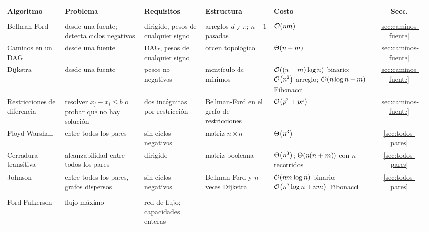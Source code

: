 \documentclass[11pt,letterpaper]{article}
\begin{document}
\begin{center}
\begin{tabular}{@{}>{\raggedright\arraybackslash}p{2.5cm}%
                >{\raggedright\arraybackslash}p{3.3cm}%
                >{\raggedright\arraybackslash}p{3.1cm}%
                >{\raggedright\arraybackslash}p{2.7cm}%
                >{\raggedright\arraybackslash}p{2.9cm}c@{}}
  \toprule
  \textbf{Algoritmo} & \textbf{Problema} & \textbf{Requisitos}
    & \textbf{Estructura} & \textbf{Costo} & \textbf{Secc.} \\
  \midrule
  \multicolumn{6}{@{}l}{\textit{Caminos más cortos}} \\
  \addlinespace[2pt]
  Bellman-Ford & desde una fuente; detecta ciclos negativos
      & dirigido, pesos de cualquier signo
      & arreglos $d$ y $\pi$; $n - 1$ pasadas
      & $\mathcal{O}\!\left(nm\right)$ & \ref{sec:caminos-fuente} \\
  \addlinespace
  Caminos en un DAG & desde una fuente
      & DAG, pesos de cualquier signo
      & orden topológico & $\Theta\!\left(n + m\right)$
      & \ref{sec:caminos-fuente} \\
  \addlinespace
  Dijkstra & desde una fuente
      & pesos no negativos
      & montículo de mínimos
      & $\mathcal{O}\!\left((n + m) \log n\right)$ binario; $\mathcal{O}\!\left(n^2\right)$ arreglo;
        $\mathcal{O}\!\left(n \log n + m\right)$ Fibonacci
      & \ref{sec:caminos-fuente} \\
  \addlinespace
  Restricciones de diferencia & resolver $x_j - x_i \le b$ o probar
        que no hay solución
      & dos incógnitas por restricción
      & Bellman-Ford en el grafo de restricciones
      & $\mathcal{O}\!\left(p^2 + pr\right)$ & \ref{sec:caminos-fuente} \\
  \addlinespace
  Floyd-Warshall & entre todos los pares
      & sin ciclos negativos
      & matriz $n \times n$ & $\Theta\!\left(n^3\right)$ & \ref{sec:todos-pares} \\
  \addlinespace
  Cerradura transitiva & alcanzabilidad entre todos los pares
      & dirigido & matriz booleana
      & $\Theta\!\left(n^3\right)$; $\Theta\!\left(n(n + m)\right)$ con $n$ recorridos
      & \ref{sec:todos-pares} \\
  \addlinespace
  Johnson & entre todos los pares, grafos dispersos
      & sin ciclos negativos
      & Bellman-Ford y $n$ veces Dijkstra
      & $\mathcal{O}\!\left(nm \log n\right)$ binario; $\mathcal{O}\!\left(n^2 \log n + nm\right)$ Fibonacci
      & \ref{sec:todos-pares} \\
  \midrule
  \multicolumn{6}{@{}l}{\textit{Flujo y emparejamiento}} \\
  \addlinespace[2pt]
  Ford-Fulkerson & flujo máximo
      & red de flujo; capacidades enteras

\end{tabular}
\end{center}
\end{document}
